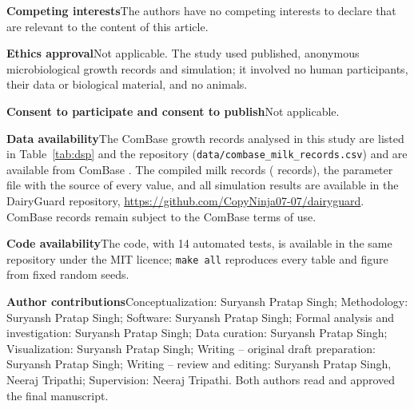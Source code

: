 \documentclass[10pt,twocolumn,twoside,a4paper]{article}
\newcommand{\ListeriaRef}{the repository (\texttt{data/combase\_milk\_records.csv})}
\begin{document}
\noindent\textbf{Competing interests}\enspace The authors have no competing interests to declare that are relevant to the content of this article.

\noindent\textbf{Ethics approval}\enspace Not applicable. The study used published, anonymous microbiological growth records and simulation; it involved no human participants, their data or biological material, and no animals.

\noindent\textbf{Consent to participate and consent to publish}\enspace Not applicable.

\noindent\textbf{Data availability}\enspace The ComBase growth records analysed in this study are listed in Table~\ref{tab:dsp} and \ListeriaRef{} and are available from ComBase \cite{combase}. The compiled milk records (\DatNFull{} records), the parameter file with the source of every value, and all simulation results are available in the DairyGuard repository, \url{https://github.com/CopyNinja07-07/dairyguard}. ComBase records remain subject to the ComBase terms of use.

\noindent\textbf{Code availability}\enspace The code, with 14 automated tests, is available in the same repository under the MIT licence; \texttt{make all} reproduces every table and figure from fixed random seeds.

\noindent\textbf{Author contributions}\enspace Conceptualization: Suryansh Pratap Singh; Methodology: Suryansh Pratap Singh; Software: Suryansh Pratap Singh; Formal analysis and investigation: Suryansh Pratap Singh; Data curation: Suryansh Pratap Singh; Visualization: Suryansh Pratap Singh; Writing -- original draft preparation: Suryansh Pratap Singh; Writing -- review and editing: Suryansh Pratap Singh, Neeraj Tripathi; Supervision: Neeraj Tripathi. Both authors read and approved the final manuscript.


\FloatBarrier

\end{document}
